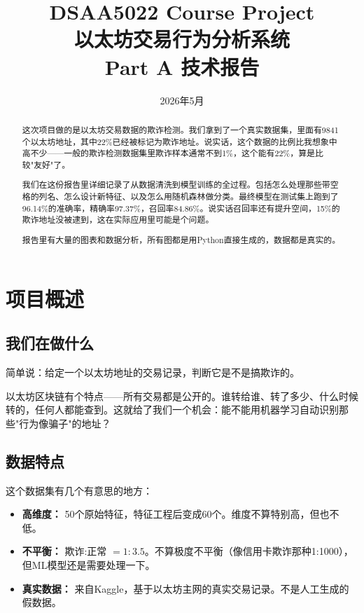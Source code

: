 \documentclass[12pt,a4paper]{article}
\title{\textbf{DSAA5022 Course Project} \\ \vspace{0.5em} \Large 以太坊交易行为分析系统 \\ \vspace{0.3em} \large Part A 技术报告}
\author{}
\date{2026年5月}
\begin{document}
\maketitle

\begin{abstract}
这次项目做的是以太坊交易数据的欺诈检测。我们拿到了一个真实数据集，里面有9841个以太坊地址，其中22\%已经被标记为欺诈地址。说实话，这个数据的比例比我想象中高不少——一般的欺诈检测数据集里欺诈样本通常不到1\%，这个能有22\%，算是比较"友好"了。

我们在这份报告里详细记录了从数据清洗到模型训练的全过程。包括怎么处理那些带空格的列名、怎么设计新特征、以及怎么用随机森林做分类。最终模型在测试集上跑到了96.14\%的准确率，精确率97.37\%，召回率84.86\%。说实话召回率还有提升空间，15\%的欺诈地址没被逮到，这在实际应用里可能是个问题。

报告里有大量的图表和数据分析，所有图都是用Python直接生成的，数据都是真实的。
\end{abstract}

\tableofcontents
\newpage

\section{项目概述}

\subsection{我们在做什么}

简单说：给定一个以太坊地址的交易记录，判断它是不是搞欺诈的。

以太坊区块链有个特点——所有交易都是公开的。谁转给谁、转了多少、什么时候转的，任何人都能查到。这就给了我们一个机会：能不能用机器学习自动识别那些"行为像骗子"的地址？

\subsection{数据特点}

这个数据集有几个有意思的地方：

\begin{itemize}
    \item \textbf{高维度：} 50个原始特征，特征工程后变成60个。维度不算特别高，但也不低。
    \item \textbf{不平衡：} 欺诈:正常 $= 1:3.5$。不算极度不平衡（像信用卡欺诈那种1:1000），但ML模型还是需要处理一下。
    \item \textbf{真实数据：} 来自Kaggle，基于以太坊主网的真实交易记录。不是人工生成的假数据。
\end{itemize}
\end{document}
